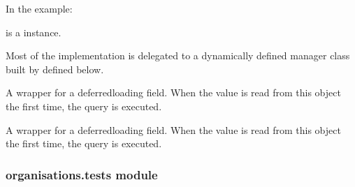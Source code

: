 \documentclass[letterpaper,10pt,english]{sphinxmanual}
\begin{document}
\begin{fulllineitems}
\begin{fulllineitems}
In the example:

\begin{sphinxVerbatim}[commandchars=\\\{\}]
 
       
\end{sphinxVerbatim}

 is a  instance.

Most of the implementation is delegated to a dynamically defined manager
class built by  defined below.

\end{fulllineitems}


\begin{fulllineitems}
\label{\detokenize{organisations:organisations.models.Organisation.suburb}}
A wrapper for a deferred\sphinxhyphen{}loading field. When the value is read from this
object the first time, the query is executed.

\end{fulllineitems}


\begin{fulllineitems}
\label{\detokenize{organisations:organisations.models.Organisation.type}}
A wrapper for a deferred\sphinxhyphen{}loading field. When the value is read from this
object the first time, the query is executed.

\end{fulllineitems}


\end{fulllineitems}



\subsubsection{organisations.tests module}
\label{\detokenize{organisations:module-organisations.tests}}\label{\detokenize{organisations:organisations-tests-module}}
\end{document}
